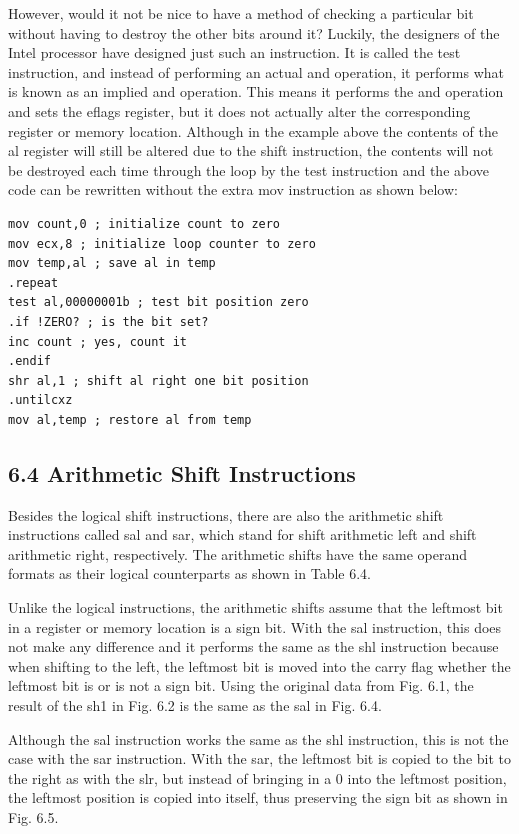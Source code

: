 \documentclass[10pt]{book}
\begin{document}
However, would it not be nice to have a method of checking a particular bit without having to destroy the other bits around it? Luckily, the designers of the Intel processor have designed just such an instruction. It is called the test instruction, and instead of performing an actual and operation, it performs what is known as an implied and operation. This means it performs the and operation and sets the eflags register, but it does not actually alter the corresponding register or memory location. Although in the example above the contents of the al register will still be altered due to the shift instruction, the contents will not be destroyed each time through the loop by the test instruction and the above code can be rewritten without the extra mov instruction as shown below:

\begin{verbatim}
mov count,0 ; initialize count to zero
mov ecx,8 ; initialize loop counter to zero
mov temp,al ; save al in temp
.repeat
test al,00000001b ; test bit position zero
.if !ZERO? ; is the bit set?
inc count ; yes, count it
.endif
shr al,1 ; shift al right one bit position
.untilcxz
mov al,temp ; restore al from temp
\end{verbatim}

\subsection*{6.4 Arithmetic Shift Instructions}
Besides the logical shift instructions, there are also the arithmetic shift instructions called sal and sar, which stand for shift arithmetic left and shift arithmetic right, respectively. The arithmetic shifts have the same operand formats as their logical counterparts as shown in Table 6.4.


Unlike the logical instructions, the arithmetic shifts assume that the leftmost bit in a register or memory location is a sign bit. With the sal instruction, this does not make any difference and it performs the same as the shl instruction because when shifting to the left, the leftmost bit is moved into the carry flag whether the leftmost bit is or is not a sign bit. Using the original data from Fig. 6.1, the result of the sh1 in Fig. 6.2 is the same as the sal in Fig. 6.4.

Although the sal instruction works the same as the shl instruction, this is not the case with the sar instruction. With the sar, the leftmost bit is copied to the bit to the right as with the slr, but instead of bringing in a 0 into the leftmost position, the leftmost position is copied into itself, thus preserving the sign bit as shown in Fig. 6.5.
\end{document}
